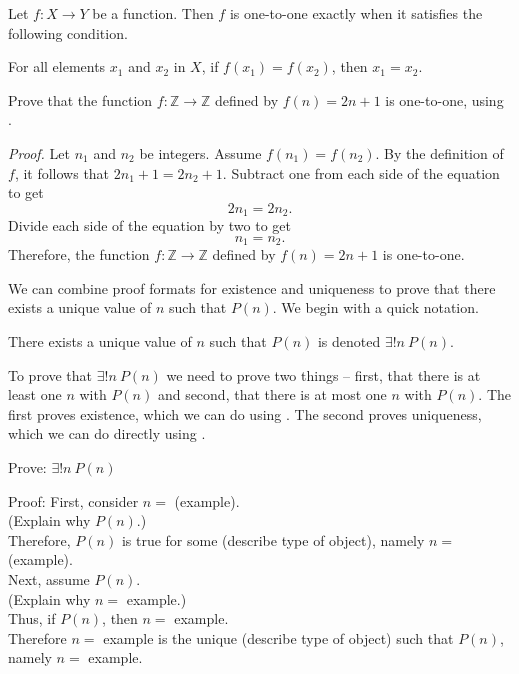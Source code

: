 \begin{rem}
\label{rem_alt_defn_onetoone}
    Let $f: X \to Y$ be a function. Then $f$ is one-to-one exactly when it satisfies the following condition.
        \begin{center}
            For all elements $x_1$ and $x_2$ in $X$, if $f(x_1) = f(x_2)$, then $x_1 = x_2$.
        \end{center}
\end{rem}

\begin{exam}
\label{exam_prove_onetoone}
    Prove that the function $f: \mathbb{Z} \to \mathbb{Z}$ defined by $f(n) = 2n+1$ is one-to-one, using .

        \begin{soln}
            \emph{Proof.}  Let $n_1$ and $n_2$ be integers. Assume $f(n_1) = f(n_2)$.  By the definition of $f$, it follows that $2n_1+1=2n_2+1$.  Subtract one from each side of the equation to get $$2n_1 = 2n_2.$$ Divide each side of the equation by two to get $$n_1 = n_2.$$  Therefore, the function $f: \mathbb{Z} \to \mathbb{Z}$ defined by $f(n) = 2n+1$ is one-to-one. 
        \end{soln}
\end{exam}

We can combine proof formats for existence and uniqueness to prove that there exists a unique value of $n$ such that $P(n)$. We begin with a quick notation.

\begin{rem}
\label{rem_notation_unique}
    There exists a unique value of $n$ such that $P(n)$ is denoted $\exists ! n ~ P(n)$.
\end{rem}

To prove that $\exists ! n ~ P(n)$ we need to prove two things -- first, that there is at least one $n$ with $P(n)$ and second, that there is at most one $n$ with $P(n)$.  The first proves existence, which we can do using . The second proves uniqueness, which we can do directly using .

\begin{pff}
\label{pff_exists_unique}
    Prove: $\exists ! n ~ P(n)$ 
    
    Proof: First, consider $n=$ (example). \\
    (Explain why $P(n)$.) \\
    Therefore, $P(n)$ is true for some (describe type of object), namely $n=$ (example).\\

    Next, assume $P(n)$. \\
    (Explain why $n=$ example.) \\
    Thus, if $P(n)$, then $n=$ example.  \\
    Therefore $n=$ example is the unique (describe type of object) such that $P(n)$, namely $n=$ example.
\end{pff}

